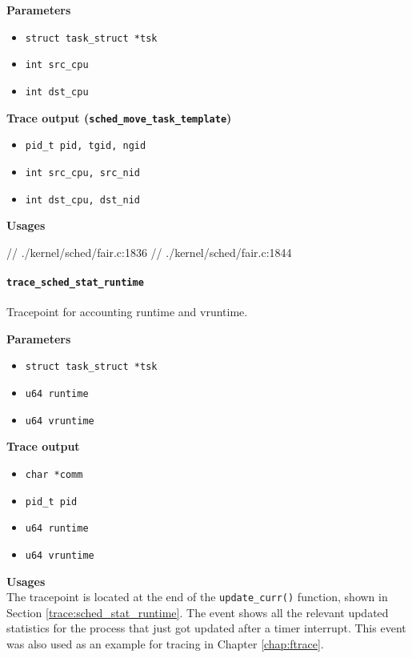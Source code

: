 \textbf{Parameters}
\begin{itemize}
    \item \verb|struct task_struct *tsk|
    \item \verb|int src_cpu|
    \item \verb|int dst_cpu|
\end{itemize}

\textbf{Trace output (\texttt{sched\_move\_task\_template})}
\begin{itemize}
    \item \verb|pid_t pid, tgid, ngid|
    \item \verb|int src_cpu, src_nid|
    \item \verb|int dst_cpu, dst_nid|
\end{itemize}

\textbf{Usages}
\begin{code}
// ./kernel/sched/fair.c:1836
// ./kernel/sched/fair.c:1844
\end{code}

\paragraph{\texttt{trace\_sched\_stat\_runtime}}
Tracepoint for accounting runtime and vruntime.

\textbf{Parameters}
\begin{itemize}
    \item \verb|struct task_struct *tsk|
    \item \verb|u64 runtime|
    \item \verb|u64 vruntime|    
\end{itemize}

\textbf{Trace output}
\begin{itemize}
    \item \verb|char *comm|
    \item \verb|pid_t pid|
    \item \verb|u64 runtime|
    \item \verb|u64 vruntime|
\end{itemize}

\textbf{Usages}\\
The tracepoint is located at the end of the \verb|update_curr()| function, shown in Section \ref{trace:sched_stat_runtime}. The event shows all the relevant updated statistics for the process that just got updated after a timer interrupt. This event was also used as an example for tracing in Chapter \ref{chap:ftrace}.

